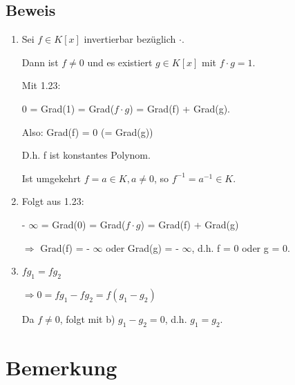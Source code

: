 \documentclass[a4paper, openany]{book}
\begin{document}
  \subsection{Beweis}
    \begin{enumerate}[label=(\alph*)]
      \item Sei $f \in K[x]$ invertierbar bezüglich $\cdot$.

      Dann ist $f \neq 0$ und es existiert $g \in K[x]$ mit $f \cdot g = 1$.

      Mit 1.23:

      0 = Grad(1) = Grad($f \cdot g$) = Grad(f) + Grad(g).

      Also: Grad(f) = 0 (= Grad(g))

      D.h. f ist konstantes Polynom.

      Ist umgekehrt $f = a \in K, a \neq 0$, so $f^{-1} = a^{-1} \in K$.

      \item Folgt aus 1.23:

      - $\infty$ = Grad(0) = Grad($f \cdot g$) = Grad(f) + Grad(g)

      $\Rightarrow$ Grad(f) = - $\infty$ oder Grad(g) = - $\infty$, d.h. f = 0 oder g = 0.

      \item $fg_1 = fg_2$ 

      $\Rightarrow 0 = fg_1 - fg_2 = f (g_1 - g_2)$

      Da $f \neq 0$, folgt mit b) $g_1-g_2 = 0$, d.h. $g_1 = g_2$.
    \end{enumerate}

    \section{Bemerkung}
\end{document}
